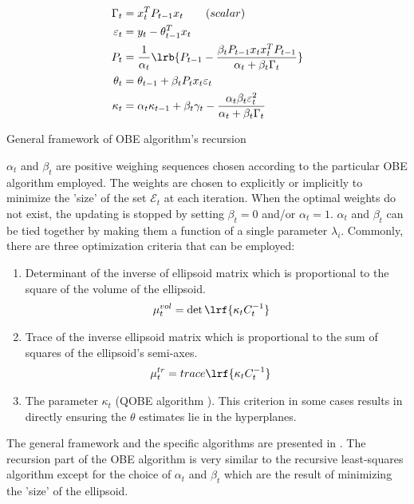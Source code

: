 \begin{algorithm}
        \begin{align*}
                \Gamma_t &= x_t^T P_{t-1} x_t \qquad (scalar)\\
                \varepsilon_t &= y_t - \theta_{t-1}^T x_t\\
                P_t &= \frac{1}{\alpha_t} \lrb{P_{t-1} - \frac{\beta_t P_{t-1} x_t x_t^T P_{t-1}}{\alpha_t + \beta_t \Gamma_t}}\\
                \theta_t &= \theta_{t-1} + \beta_t P_t x_t \varepsilon_t\\
                \kappa_t &= \alpha_t \kappa_{t-1} + \beta_t \gamma_t - \frac{\alpha_t \beta_t \varepsilon_t^2}{\alpha_t + \beta_t \Gamma_t}
        \end{align*}
        \caption{General framework of OBE algorithm's recursion \cite{deller1994unifying}}
\end{algorithm}

$\alpha_t$ and $\beta_t$ are positive weighing sequences chosen according to the particular OBE algorithm employed. The weights are chosen to explicitly or implicitly to minimize the 'size' of the set $\mathcal{E}_t$ at each iteration. When the optimal weights do not exist, the updating is stopped by setting $\beta_t  = 0$ and/or $\alpha_t = 1$.  $\alpha_t$ and $\beta_t$ can be tied together by making them a function of a single parameter $\lambda_i$. Commonly, there are three optimization criteria that can be employed:
\begin{enumerate}
        \item Determinant of the inverse of ellipsoid matrix which is proportional to the square of the volume of the ellipsoid.
        \begin{align}
                \mu_t^{vol} &= \det \lrf{\kappa_t C_t^{-1}}
        \end{align}

        \item Trace of the inverse ellipsoid matrix which is proportional to the sum of squares of the ellipsoid's semi-axes.
        \begin{align}
                \mu_t^{tr} &= trace \lrf{\kappa_t C_t^{-1}}
        \end{align}

        \item The parameter $\kappa_t$ (QOBE algorithm \cite{deller1993least}). This criterion in some cases results in directly ensuring the $\theta$ estimates lie in the hyperplanes.
\end{enumerate}
The general framework and the specific algorithms are presented in \cite{deller2002set}. The recursion part of the OBE algorithm is very similar to the recursive least-squares algorithm \cite{deller1989set} except for the choice of $\alpha_t$ and $\beta_t$ which are the result of minimizing the 'size' of the ellipsoid.





